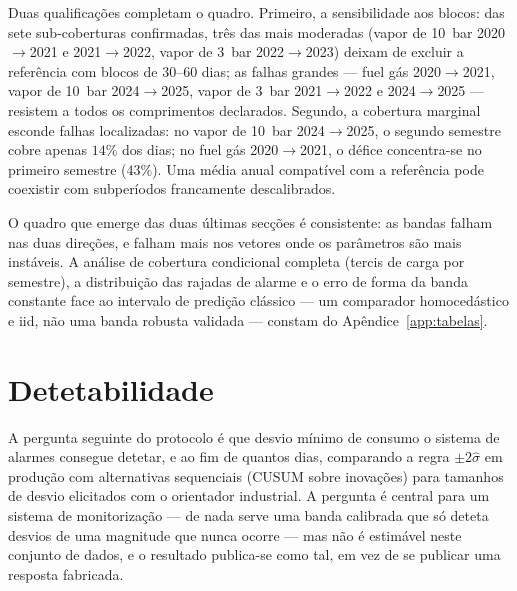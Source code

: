 Duas qualificações completam o quadro. Primeiro, a sensibilidade aos blocos:
das sete sub-coberturas confirmadas, três das mais moderadas (vapor de 10~bar
2020${\to}$2021 e 2021${\to}$2022, vapor de 3~bar 2022${\to}$2023) deixam de
excluir a referência com blocos de 30--60 dias; as falhas grandes ---
fuel gás 2020${\to}$2021, vapor de 10~bar 2024${\to}$2025, vapor de 3~bar
2021${\to}$2022 e 2024${\to}$2025 --- resistem a todos os comprimentos
declarados. Segundo, a cobertura marginal esconde falhas localizadas: no
vapor de 10~bar 2024${\to}$2025, o segundo semestre cobre apenas $14\%$ dos
dias; no fuel gás 2020${\to}$2021, o défice concentra-se no primeiro semestre
($43\%$). Uma média anual compatível com a referência pode coexistir com
subperíodos francamente descalibrados.

O quadro que emerge das duas últimas secções é consistente: as bandas falham
nas duas direções, e falham mais nos vetores onde os parâmetros são mais
instáveis. A análise de cobertura condicional completa (tercis de carga por
semestre), a distribuição das rajadas de alarme e o erro de forma da banda
constante face ao intervalo de predição clássico --- um comparador
homocedástico e iid, não uma banda robusta validada --- constam do
Apêndice~\ref{app:tabelas}.

\section{Detetabilidade}
\label{sec:detetabilidade}

A pergunta seguinte do protocolo é que desvio mínimo de consumo o sistema de alarmes
consegue detetar, e ao fim de quantos dias, comparando a regra
$\pm 2\hat\sigma$ em produção com alternativas sequenciais (CUSUM sobre
inovações) para tamanhos de desvio elicitados com o orientador industrial. A
pergunta é central para um sistema de monitorização --- de nada serve uma
banda calibrada que só deteta desvios de uma magnitude que nunca ocorre ---
mas não é estimável neste conjunto de dados, e o resultado publica-se como
tal, em vez de se publicar uma resposta fabricada.

